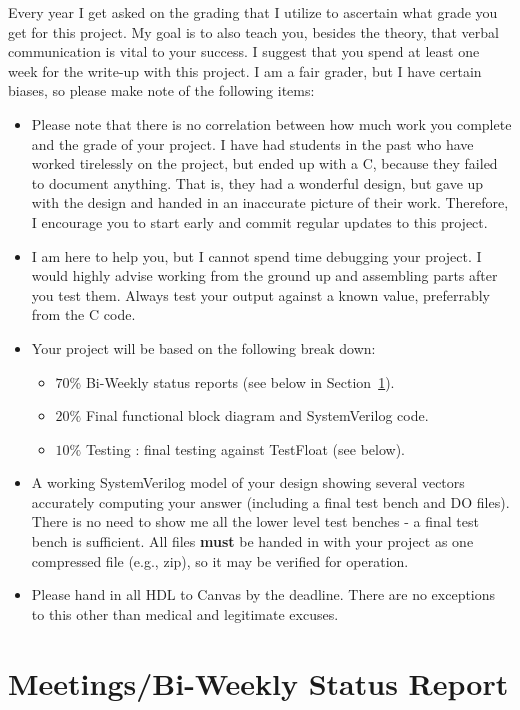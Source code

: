 \documentclass[times, 10pt, twocolumn]{IEEEtran}
\begin{document}
Every year I get asked on the grading that I utilize to ascertain what grade
  you get for this project.  My goal is to also teach you, besides the theory,
  that verbal communication is vital to your success.  I suggest that you
  spend at least one week for the write-up with this project.  I am a fair
  grader, but I have certain biases, so please make note of the following
  items:
\begin{itemize}
\item  Please note that there is no correlation between how much work
  you complete and the grade of your project. I have had students in the past
  who have worked tirelessly on the project, but ended up with a C, because
  they failed to document anything.  That is, they had a wonderful design,
  but gave up with the design and handed in an inaccurate picture of their
  work.  Therefore, I encourage you to start early and commit regular
  updates to this project.
\item I am here to help you, but I cannot spend time debugging your
  project.  I would highly advise working from the ground up and assembling
  parts after you test them.  Always test your output against a known
  value, preferrably from the C code.
\item Your project will be based on the following break down:
\begin{itemize}
\item $70\%$ Bi-Weekly status reports (see below in Section~\ref{Status.sec}).
\item $20\%$ Final functional block diagram and SystemVerilog code.
\item $10\%$ Testing : final testing against TestFloat (see below).
\end{itemize}
\item A working SystemVerilog model of your design showing
  several vectors accurately computing your answer (including a final test
  bench and DO files).  There is no need to show me all the lower
  level test benches - a final test bench is sufficient.  All files
  \textbf{must} be handed in with your project
  as one compressed file (e.g., zip), so it may be verified for operation.
\item Please hand in all HDL to Canvas by the deadline.  There are no
  exceptions to this other than medical and legitimate excuses.  
\end{itemize}

\section{Meetings/Bi-Weekly Status Report}
\label{Status.sec}
\end{document}
